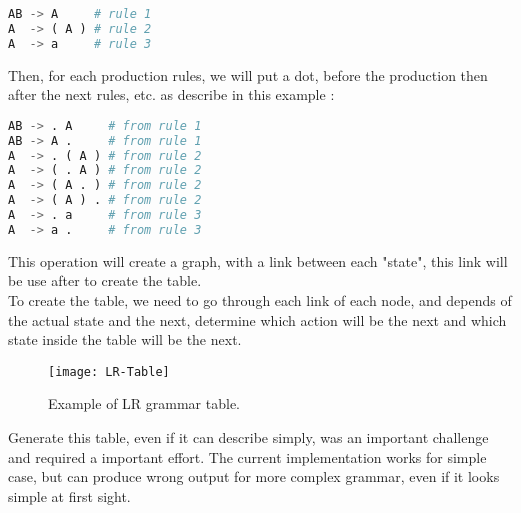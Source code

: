 \begin{lstlisting}[language=python, caption=example CNF grammar]
AB -> A     # rule 1
A  -> ( A ) # rule 2
A  -> a     # rule 3
\end{lstlisting}

Then, for each production rules, we will put a dot, before the production then after the next rules, etc. as describe in this example :

\begin{lstlisting}[language=python, caption=example of the "walk the dot" algorithm]
AB -> . A     # from rule 1
AB -> A .     # from rule 1
A  -> . ( A ) # from rule 2
A  -> ( . A ) # from rule 2
A  -> ( A . ) # from rule 2
A  -> ( A ) . # from rule 2
A  -> . a     # from rule 3
A  -> a .     # from rule 3
\end{lstlisting}

This operation will create a graph, with a link between each "state", this link will be use after to create the table.\\
To create the table, we need to go through each link of each node, and depends of the actual state and the next, determine which action will be the next and which state inside the table will be the next.\\
\begin{figure}[h]
\centering
\texttt{[image: LR-Table]}
\caption{Example of LR grammar table. \cite{wikilr:online} }
\end{figure}
Generate this table, even if it can describe simply, was an important challenge and required a important effort. The current implementation works for simple case, but can produce wrong output for more complex grammar, even if it looks simple at first sight.

